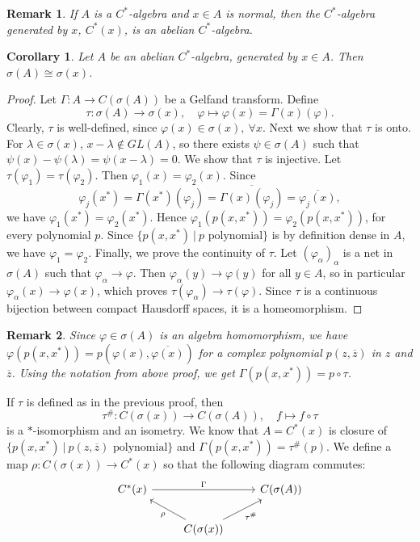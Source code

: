 \documentclass[10pt, a4paper]{article}
\newtheorem{corollary}[thm]{Corollary}
\newtheorem*{remark}{Remark}
\newenvironment{noticeC}{%
  \tcolorbox[%
  notitle,
  empty,
  enhanced,  %
  breakable,
  coltext=black, 
  fontupper=\rmfamily,
  noparskip,
  sharp corners,
  boxrule=-1pt,  %
  frame hidden,
  left=7pt,  %
  right=7pt,
  top=5pt,
  bottom=5pt,
  before skip=2.5ex plus 2pt,
  after skip=2.5ex plus 2pt,
  overlay unbroken and last={%
  },
  ]}
{\endtcolorbox}
\newenvironment{myproof}%
  {\begin{noticeC}\begin{proof}}%
  {\end{proof}\end{noticeC}}
\begin{document}
\begin{remark}
  If $A$ is a $C^*$-algebra and $x \in A$ is normal, then the $C^*$-algebra generated by $x$, $C^*(x)$, is an abelian $C^*$-algebra.
\end{remark}

\begin{corollary}
  Let $A$ be an abelian $C^*$-algebra, generated by $x \in A$. Then $\sigma (A) \cong \sigma(x)$.
\end{corollary}

\begin{myproof}
  Let $\Gamma: A \to C(\sigma(A))$ be a Gelfand transform.
  Define $$\tau: \sigma(A) \to \sigma(x),\quad \varphi \mapsto \varphi(x) = \Gamma(x) (\varphi).$$
  Clearly, $\tau$ is well-defined, since $\varphi(x) \in \sigma (x),\ \forall x$.
  Next we show that $\tau$ is onto. For $\lambda \in \sigma(x)$,
  $x - \lambda \notin GL(A)$, so there exists $\psi \in \sigma(A)$ such that $\psi(x) - \psi (\lambda) = \psi (x - \lambda) = 0$.
  We show that $\tau$ is injective. Let $\tau (\varphi_1) = \tau(\varphi_2)$.
  Then $\varphi_1(x) = \varphi_2(x)$. Since 
  $$\varphi_j (x^*) = \Gamma(x^*) (\varphi_j) = \overline{\Gamma(x)(\varphi_j)} = \overline{\varphi_j(x)},$$
  we have $\varphi_1(x^*) = \varphi_2(x^*)$. Hence $\varphi_1 (p(x, x^*)) = \varphi_2(p(x, x^*))$, for every polynomial $p$.
  Since $\{p(x, x^*)\ |\ \textrm{$p$ polynomial}\}$ is by definition dense in $A$, we have $\varphi_1 = \varphi_2$.
  Finally, we prove the continuity of $\tau$. Let $(\varphi_\alpha)_{\alpha}$ is a net in $\sigma(A)$ such that $\varphi_\alpha \to \varphi$.
  Then $\varphi_\alpha(y) \to \varphi(y)$ for all $y \in A$, so in particular $\varphi_\alpha (x) \to \varphi(x)$,
  which proves $\tau (\varphi_\alpha) \to \tau(\varphi)$. Since $\tau$ is a continuous bijection between compact
  Hausdorff spaces, it is a homeomorphism.
\end{myproof}

\begin{remark}
  Since $\varphi \in \sigma(A)$ is an algebra homomorphism, we have $\varphi(p(x, x^*)) = p(\varphi(x), \overline{\varphi(x)})$
  for a complex polynomial $p(z, \overline{z})$ in $z$ and $\overline{z}$. Using the notation from above proof, 
  we get $\Gamma (p(x, x^*)) = p \circ \tau$.
\end{remark}

If $\tau$ is defined as in the previous proof, then $$\tau^{\#}: C(\sigma(x)) \to C(\sigma(A)),\quad f \mapsto f \circ \tau$$
is a $*$-isomorphism and an isometry. We know that $A = C^*(x)$ is closure of $\{p(x, x^*)\ |\ \textrm{$p (z, \overline{z})$ polynomial}\}$
and $\Gamma (p(x, x^*)) = \tau^{\#} (p)$. We define a map $\rho: C(\sigma(x)) \to C^*(x)$
so that the following diagram commutes:
\[\begin{tikzcd}
	{C^*(x)} && {C(\sigma(A))} \\
	& {C(\sigma(x))}
	\arrow["{\tau^{\#}}"', from=2-2, to=1-3]
	\arrow["\rho", from=2-2, to=1-1]
	\arrow["\Gamma", from=1-1, to=1-3]
\end{tikzcd}\]
\end{document}
